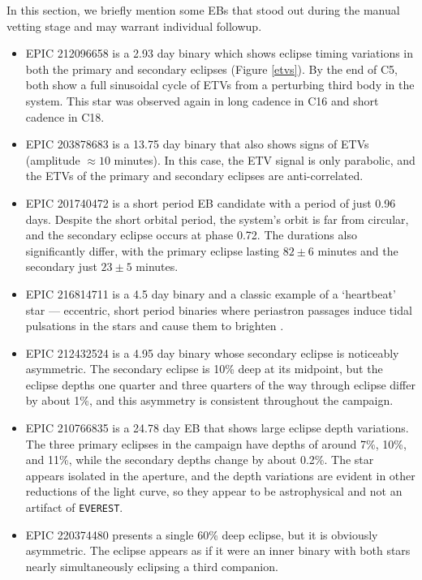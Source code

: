 \documentclass[twocolumn]{aastex62}
\newcommand{\pipeline}[1]{\texttt{#1}}
\begin{document}
In this section, we briefly mention some EBs that stood out during the
manual vetting stage and may warrant individual followup.

\begin{itemize}

\item EPIC 212096658 is a 2.93 day binary which shows eclipse timing
  variations in both the primary and secondary eclipses (Figure
  \ref{etvs}).  By the end of C5, both show a full sinusoidal cycle of
  ETVs from a perturbing third body in the system. This star was
  observed again in long cadence in C16 and short cadence in C18.

\item EPIC 203878683 is a 13.75 day binary that also shows signs of
  ETVs (amplitude $\approx10$ minutes). In this case, the ETV signal
  is only parabolic, and the ETVs of the primary and secondary
  eclipses are anti-correlated.

\item EPIC 201740472 is a short period EB candidate with a period of
  just 0.96 days. Despite the short orbital period, the system's orbit
  is far from circular, and the secondary eclipse occurs at phase
  0.72. The durations also significantly differ, with the primary
  eclipse lasting $82\pm6$ minutes and the secondary just $23\pm5$
  minutes.

\item EPIC 216814711 is a 4.5 day binary and a classic example of a
  `heartbeat' star --- eccentric, short period binaries where
  periastron passages induce tidal pulsations in the stars and cause
  them to brighten \citep{tho12}.

\item EPIC 212432524 is a 4.95 day binary whose secondary eclipse is
  noticeably asymmetric. The secondary eclipse is 10\% deep at its
  midpoint, but the eclipse depths one quarter and three quarters of
  the way through eclipse differ by about 1\%, and this asymmetry is
  consistent throughout the campaign.

\item EPIC 210766835 is a 24.78 day EB that shows large eclipse depth
  variations. The three primary eclipses in the campaign have depths
  of around 7\%, 10\%, and 11\%, while the secondary depths change by
  about 0.2\%. The star appears isolated in the aperture, and the
  depth variations are evident in other reductions of the light curve,
  so they appear to be astrophysical and not an artifact of
  \pipeline{EVEREST}.

\item EPIC 220374480 presents a single 60\% deep eclipse, but it is
  obviously asymmetric. The eclipse appears as if it were an inner
  binary with both stars nearly simultaneously eclipsing a third
  companion.

\end{itemize}
\end{document}
